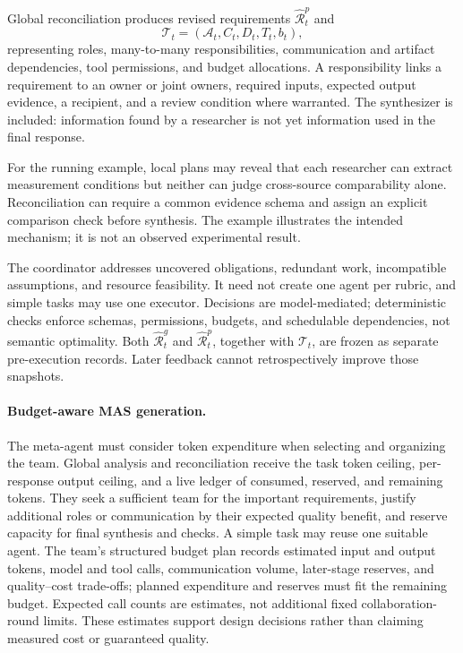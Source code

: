 \documentclass[11pt]{article}
\newcommand{\rub}{\widehat{\mathcal{R}}}
\newcommand{\team}{\mathcal{T}}
\begin{document}
Global reconciliation produces revised requirements $\rub_t^p$ and
\begin{equation}
\team_t=(\mathcal A_t,C_t,D_t,T_t,b_t),
\end{equation}
representing roles, many-to-many responsibilities, communication and artifact dependencies, tool permissions, and budget allocations. A responsibility links a requirement to an owner or joint owners, required inputs, expected output evidence, a recipient, and a review condition where warranted. The synthesizer is included: information found by a researcher is not yet information used in the final response.

For the running example, local plans may reveal that each researcher can extract measurement conditions but neither can judge cross-source comparability alone. Reconciliation can require a common evidence schema and assign an explicit comparison check before synthesis. The example illustrates the intended mechanism; it is not an observed experimental result.

The coordinator addresses uncovered obligations, redundant work, incompatible assumptions, and resource feasibility. It need not create one agent per rubric, and simple tasks may use one executor. Decisions are model-mediated; deterministic checks enforce schemas, permissions, budgets, and schedulable dependencies, not semantic optimality. Both $\rub_t^g$ and $\rub_t^p$, together with $\team_t$, are frozen as separate pre-execution records. Later feedback cannot retrospectively improve those snapshots.

\paragraph{Budget-aware MAS generation.}
The meta-agent must consider token expenditure when selecting and organizing the team. Global analysis and reconciliation receive the task token ceiling, per-response output ceiling, and a live ledger of consumed, reserved, and remaining tokens. They seek a sufficient team for the important requirements, justify additional roles or communication by their expected quality benefit, and reserve capacity for final synthesis and checks. A simple task may reuse one suitable agent. The team's structured budget plan records estimated input and output tokens, model and tool calls, communication volume, later-stage reserves, and quality--cost trade-offs; planned expenditure and reserves must fit the remaining budget. Expected call counts are estimates, not additional fixed collaboration-round limits. These estimates support design decisions rather than claiming measured cost or guaranteed quality.
\end{document}
